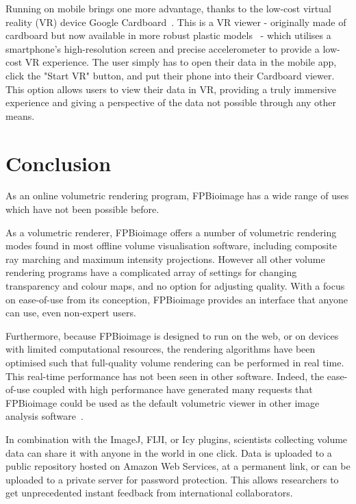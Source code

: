 Running on mobile brings one more advantage, thanks to the low-cost virtual reality (VR) device Google Cardboard~\cite{cardboard}.
This is a VR viewer - originally made of cardboard but now available in more robust plastic models~\cite{get2018cardboard} - which utilises a smartphone's high-resolution screen and precise accelerometer to provide a low-cost VR experience.
The user simply has to open their data in the mobile app, click the "Start VR" button, and put their phone into their Cardboard viewer.
This option allows users to view their data in VR, providing a truly immersive experience and giving a perspective of the data not possible through any other means.



\section{Conclusion} %
As an online volumetric rendering program, FPBioimage has a wide range of uses which have not been possible before.

As a volumetric renderer, FPBioimage offers a number of volumetric rendering modes found in most offline volume visualisation software, including composite ray marching and maximum intensity projections.
However all other volume rendering programs have a complicated array of settings for changing transparency and colour maps, and no option for adjusting quality.
With a focus on ease-of-use from its conception, FPBioimage provides an interface that anyone can use, even non-expert users.

Furthermore, because FPBioimage is designed to run on the web, or on devices with limited computational resources, the rendering algorithms have been optimised such that full-quality volume rendering can be performed in real time.
This real-time performance has not been seen in other software.
Indeed, the ease-of-use coupled with high performance have generated many requests that FPBioimage could be used as the default volumetric viewer in other image analysis software~\cite{twitter2018fantm}.

In combination with the ImageJ, FIJI, or Icy plugins, scientists collecting volume data can share it with anyone in the world in one click.
Data is uploaded to a public repository hosted on Amazon Web Services, at a permanent link, or can be uploaded to a private server for password protection.
This allows researchers to get unprecedented instant feedback from international collaborators.

